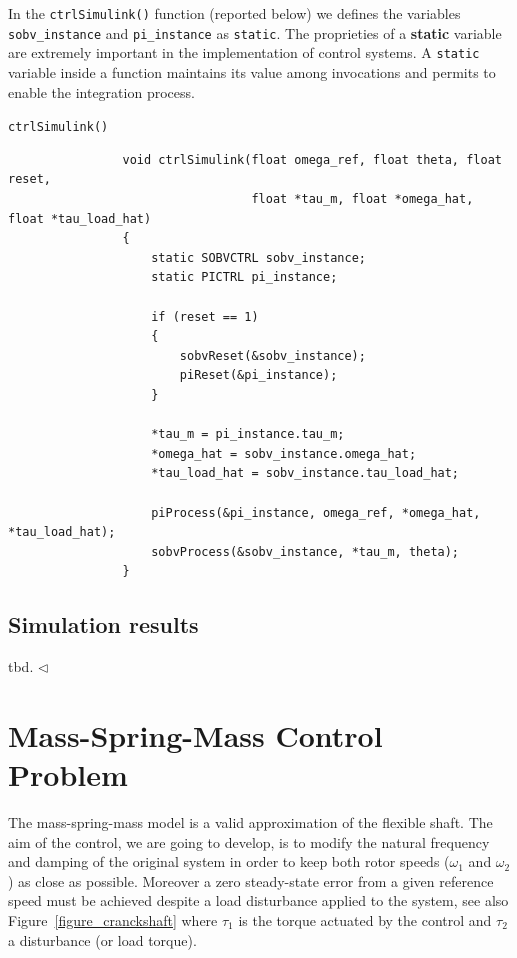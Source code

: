 \documentclass[11pt,a4paper,oneside]{book}
\numberwithin{equation}{section}
\theoremstyle{it}
\theoremstyle{definition}
\begin{document}
	In the \texttt{ctrlSimulink()} function (reported below) we defines the variables \texttt{sobv\_instance} and \texttt{pi\_instance} as \texttt{static}. The proprieties of a \textbf{static} variable are extremely important in the implementation of control systems. A \texttt{static} variable inside a function maintains its value among invocations and permits to enable the integration process.
	\begin{mybox}
			\begin{center}
					{\selectfont \verb+ctrlSimulink()+}
				\end{center}
		{\selectfont \footnotesize \noindent
			\begin{verbatim}
				void ctrlSimulink(float omega_ref, float theta, float reset, 
				                  float *tau_m, float *omega_hat, float *tau_load_hat)
				{
				    static SOBVCTRL sobv_instance;
				    static PICTRL pi_instance; 
					
					if (reset == 1)
					{
					    sobvReset(&sobv_instance);
					    piReset(&pi_instance);
					}
					
					*tau_m = pi_instance.tau_m;
					*omega_hat = sobv_instance.omega_hat;
					*tau_load_hat = sobv_instance.tau_load_hat;
					
					piProcess(&pi_instance, omega_ref, *omega_hat, *tau_load_hat);   
					sobvProcess(&sobv_instance, *tau_m, theta);
				}
		\end{verbatim}}
	\end{mybox}

\subsection{Simulation results}
tbd. 
	$\triangleleft$ 


\section{Mass-Spring-Mass Control Problem} 
The mass-spring-mass model is a valid approximation of the flexible shaft. The 
aim of the control, we are going to develop, is to modify the natural frequency 
and damping of the original system in order to keep both rotor speeds 
($\omega_1$ and $\omega_2$) as close as possible. Moreover a zero steady-state 
error from a given reference speed must be achieved despite a load disturbance 
applied to the system, see also Figure~\ref{figure_cranckshaft} where $\tau_1$ 
is the torque actuated by the control and $\tau_2$ a disturbance (or load 
torque).
\end{document}
